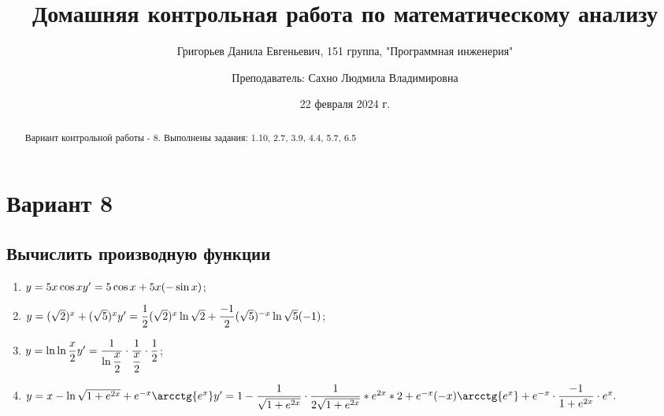 \documentclass{article}
\title{\bf{Домашняя контрольная работа по математическому анализу}}
\author{Григорьев Данила Евгеньевич, 151 группа, "Программная инженерия" \and Преподаватель: Сахно Людмила Владимировна}
\date{22 февраля 2024 г.}
\newcommand{\mysection}[3]{\setcounter{section}{#1}\setcounter{subsection}{#2}\addtocounter{subsection}{-1}\subsection{#3}}
\begin{document}
\pagestyle{fancy}
\maketitle

\begin{abstract}
    Вариант контрольной работы - 8. Выполнены задания: 1.10, 2.7, 3.9, 4.4, 5.7, 6.5
\end{abstract}

\tableofcontents
\newpage
\section*{Вариант 8}
\mysection{1}{10}{Вычислить производную функции}
\begin{enumerate}
    \item{\begin{math}
        y = 5 x \cos x \\
        y' = 5 \cos x + 5 x (- \sin x)
    \end{math}};
    
    \item{\begin{math}
        y = (\sqrt{2})^x + (\sqrt{5})^{x} \\
        y' = \dfrac 1 2 (\sqrt{2})^x \ln\sqrt{2} + \dfrac {-1} {2} (\sqrt{5})^{-x} \ln\sqrt{5}(-1)
    \end{math}};

    \item{\begin{math}
        y = \ln\ln\dfrac{x}{2} \\
        y' = \dfrac{1}{\ln\dfrac{x}{2}} \cdot \dfrac{1}{\dfrac{x}{2}} \cdot \dfrac{1}{2}
    \end{math}};

    \item{\begin{math}
        y = x - \ln\sqrt{1+e^{2x}}+e^{-x}\arcctg{e^x} \\
        y' = 1 - \dfrac{1}{\sqrt{1+e^{2x}}} \cdot \dfrac{1}{2\sqrt{1+e^{2x}}} * e^{2x} * 2 + e^{-x}(-x)\arcctg{e^x} + e^{-x} \cdot \dfrac{-1}{1+e^{2x}} \cdot e^x.
    \end{math}}
\end{enumerate}
\end{document}
